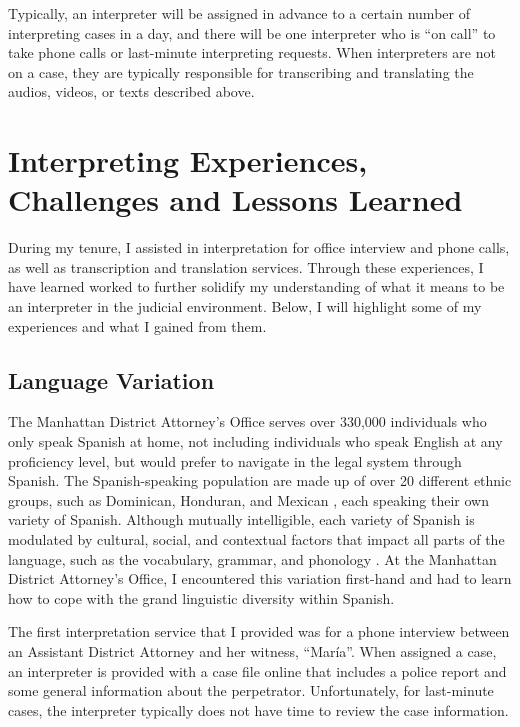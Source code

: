 \documentclass{article}
\begin{document}
Typically, an interpreter will be assigned in advance to a certain number of interpreting cases in a day, and there will be one interpreter who is “on call” to take phone calls or last-minute interpreting requests. When interpreters are not on a case, they are typically responsible for transcribing and translating the audios, videos, or texts described above.

\section{Interpreting Experiences, Challenges and Lessons Learned}

During my tenure, I assisted in interpretation for office interview and phone calls, as well as transcription and translation services. Through these experiences, I have learned worked to further solidify my understanding of what it means to be an interpreter in the judicial environment. Below, I will highlight some of my experiences and what I gained from them.

\subsection{Language Variation}

The Manhattan District Attorney’s Office serves over 330,000 individuals who only speak Spanish at home, not including individuals who speak English at any proficiency level, but would prefer to navigate in the legal system through Spanish. The Spanish-speaking population are made up of over 20 different ethnic groups, such as Dominican, Honduran, and Mexican \citep{nyc_immigrant_fact_sheet}, each speaking their own variety of Spanish. Although mutually intelligible, each variety of Spanish is modulated by cultural, social, and contextual factors that impact all parts of the language, such as the vocabulary, grammar, and phonology \citep{moreno2019variedades}. At the Manhattan District Attorney’s Office, I encountered this variation first-hand and had to learn how to cope with the grand linguistic diversity within Spanish.

The first interpretation service that I provided was for a phone interview between an Assistant District Attorney and her witness, “María”. When assigned a case, an interpreter is provided with a case file online that includes a police report and some general information about the perpetrator. Unfortunately, for last-minute cases, the interpreter typically does not have time to review the case information. 
\end{document}
